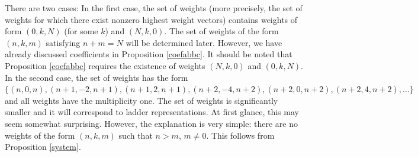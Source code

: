 \documentclass[twoside,a4paper,12pt]{article}
\theoremstyle{definition}
\begin{document}
There are two cases: In the first case, the set of weights
(more precisely, the set of weights for which there exist nonzero
highest weight vectors) contains weights of form $(0,k,N)$ (for some $k$) and
$(N,k,0)$. The set of weights of the form $(n,k,m)$ satisfying $n+m=N$ will be
determined later. However, we have already discussed coefficients in
Proposition \ref{coefabbc}. It should be noted that Proposition \ref{coefabbc}
requires the existence of weights $(N,k,0)$ and $(0,k,N)$.
In the second case, the set of weights has the form $\{(n,0,n),(n+1,-2,n+1),
(n+1,2,n+1),(n+2,-4,n+2),(n+2,0,n+2),(n+2,4,n+2),\ldots\}$ and all weights
have the multiplicity one. The set of weights
is significantly smaller and it will correspond to ladder representations.
At first glance, this may seem somewhat surprising. However, the explanation is
very simple: there are no weights of the form $(n,k,m)$ such that $n>m$,
$m\neq0$. This follows from Proposition \ref{system}.
\end{document}
